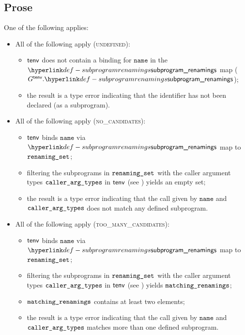\documentclass{book}
\newcommand\ProseOrTypeError[0]{\ProseTerminateAs{\TypeErrorConfig}}
\newcommand\name[0]{\texttt{name}}
\begin{document}
\subsection{Prose}
One of the following applies:
\begin{itemize}
  \item All of the following apply (\textsc{undefined}):
  \begin{itemize}
    \item $\textsf{tenv}$ does not contain a binding for $\name$ in the $\subprogramrenamings$ map
          ($G^\tenv.\subprogramrenamings$);
    \item the result is a type error indicating that the identifier has not been declared (as a subprogram).
  \end{itemize}

  \item All of the following apply (\textsc{no\_candidates}):
  \begin{itemize}
    \item $\textsf{tenv}$ binds $\name$ via $\subprogramrenamings$ map to $\texttt{renaming\_set}$;
    \item filtering the subprograms in $\texttt{renaming\_set}$ with the caller argument types $\texttt{caller\_arg\_types}$
          in $\textsf{tenv}$ (see ) yields an empty set\ProseOrTypeError;
    \item the result is a type error indicating that the call given by $\name$ and \\ $\texttt{caller\_arg\_types}$
          does not match any defined subprogram.
  \end{itemize}

  \item All of the following apply (\textsc{too\_many\_candidates}):
  \begin{itemize}
    \item $\textsf{tenv}$ binds $\name$ via $\subprogramrenamings$ map to $\texttt{renaming\_set}$;
    \item filtering the subprograms in $\texttt{renaming\_set}$ with the caller argument types $\texttt{caller\_arg\_types}$
          in $\textsf{tenv}$ (see ) yields $\texttt{matching\_renamings}$\ProseOrTypeError;
    \item $\texttt{matching\_renamings}$ contains at least two elements;
    \item the result is a type error indicating that the call given by $\name$ and \\
          $\texttt{caller\_arg\_types}$ matches more than one defined subprogram.
  \end{itemize}


\end{itemize}
\end{document}
